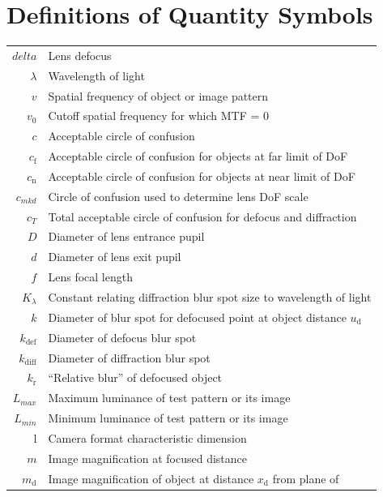 \documentclass[11pt, oneside]{scrartcl}   	%
\begin{document}
\section{Definitions of Quantity Symbols}
\begin{center}
{\small
\begin{tabular}{r@{~=~}l}
$delta$ & Lens defocus     \\
$\lambda$ & Wavelength of light     \\
$v$ & Spatial frequency of object or image pattern     \\
$v_0$ & Cutoff spatial frequency for which MTF = 0      \\
$c$ & Acceptable circle of confusion     \\
$c_\mathrm{f}$ & Acceptable circle of confusion for objects at far limit of DoF     \\
$c_\mathrm{n}$ & Acceptable circle of confusion for objects at near limit of
        DoF     \\
$c_{mkd}$ & Circle of confusion used to determine lens DoF scale     \\
$c_T$ & Total acceptable circle of confusion for defocus and
        diffraction     \\
$D$ & Diameter of lens entrance pupil      \\
$d$ & Diameter of lens exit pupil     \\
$f$ & Lens focal length     \\
$K_\lambda$ & Constant relating diffraction blur spot size to
              wavelength of light     \\
$k$ & Diameter of blur spot for defocused point at object distance
      $u_\mathrm{d}$     \\
$k_\mathrm{def}$ & Diameter of defocus blur spot     \\
$k_\mathrm{diff}$ & Diameter of diffraction blur spot     \\
$k_\mathrm{r}$ & “Relative blur” of defocused object     \\
$L_{max}$ & Maximum luminance of test pattern or its image      \\
$L_{min}$ & Minimum luminance of test pattern or its image     \\
l & Camera format characteristic dimension\\
$m$ & Image magnification at  focused distance     \\
$m_\mathrm{d}$ & Image magnification of object at distance $x_\mathrm{d}$ from plane of

\end{tabular}}
\end{center}
\end{document}
